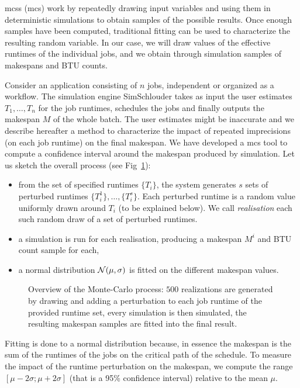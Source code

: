 \documentclass[10pt,conference,compsocconf]{IEEEtran}
\begin{document}
\aclp{mcs} (\acs{mcs})  work by  repeatedly drawing  input variables
and using  them in deterministic simulations  to obtain samples of  the possible
results. Once enough samples have been computed, traditional fitting can be used
to characterize the resulting random variable.  In our case, we will draw values
of  the  effective runtimes  of  the  individual  jobs,  and we  obtain  through
simulation samples of makespans and BTU counts.

Consider an  application consisting of  $n$ jobs,  independent or organized  as a
workflow.  The simulation engine SimSchlouder  takes as input the user estimates
$T_1, \ldots , T_n$ for the job runtimes, schedules the jobs and finally outputs
the makespan $M$ of the whole batch.  The user estimates might be inaccurate
and  we describe  hereafter  a method  to characterize  the  impact of  repeated
imprecisions (on each  job runtime) on the final makespan.   We have developed a
\ac{mcs} tool to  compute a confidence interval around the  makespan produced by
simulation.  Let us sketch the overall process (see Fig~\ref{fig:mc-process}):
\begin{itemize} 
\item from  the set of  specified runtimes  $\{T_i\}$, the system  generates $s$
  sets  of perturbed  runtimes $\{T_i^1\},  \ldots, \{T_i^s\}$.   Each perturbed
  runtime  is a  random  value  uniformly drawn  around  $T_i$  (to be explained
  below). We call \emph{realisation} each such random draw of a set of perturbed
  runtimes.
\item a simulation  is run for each realisation, producing  a makespan $M^i$ and
  BTU count sample for each,
\item a  normal distribution ${\cal  N}(\mu,\sigma)$ is fitted on  the different
  makespan values.
\end{itemize}
\begin{figure}
	\centering
	\resizebox{0.5\textwidth}{!}{%
		
		}
\caption{Overview of the Monte-Carlo process: $500$ realizations are generated
by drawing and adding a perturbation to each job runtime of the provided
runtime set, every simulation is then simulated, the resulting makespan
samples are fitted into the final result.}\label{fig:mc-process}
\end{figure}
Fitting is done to a normal distribution because, in essence the makespan is the
sum  of the  runtimes of  the jobs  on the  critical path  of the  schedule.  To
measure the impact  of the runtime perturbation on the  makespan, we compute the
range $[\mu-2\sigma;\mu+2\sigma]$ (that is  a 95\% confidence interval) relative
to  the mean  $\mu$. 
\end{document}
